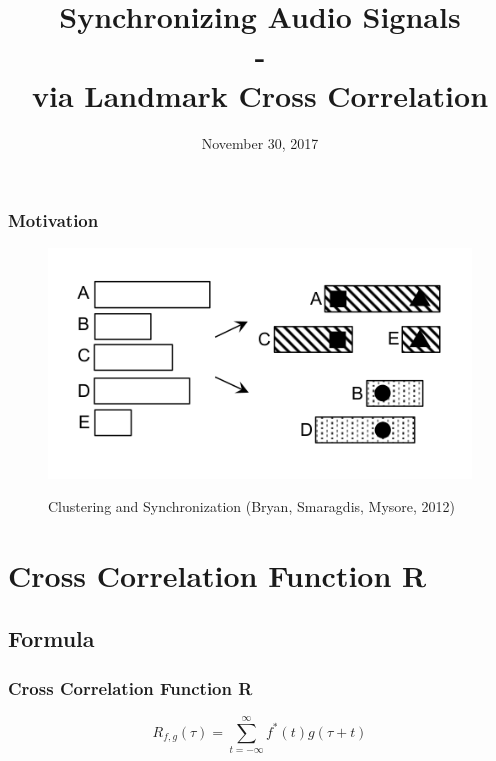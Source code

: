 \documentclass{beamer}
\title[Cross Correlation]{Synchronizing Audio Signals\\ - \\ via Landmark Cross Correlation} %
\institute[Uni Bi] %
{

\textit{by Lea N. Possberg} %

\medskip

Seminar: Speech Processing \\ %




}
\date{November 30, 2017} %
\begin{document}
\begin{frame}
\titlepage %
\end{frame}


\begin{frame}
\frametitle{Motivation} %
\begin{figure}
\begin{center}
\includegraphics[scale=0.3]{pngs/01_orig_cluster_synch.png} \\
\caption{Clustering and Synchronization (Bryan, Smaragdis, Mysore, 2012)}
\end{center}
\end{figure}
\end{frame}




\section{Cross Correlation Function R}

\subsection{Formula}
\begin{frame}
\frametitle{Cross Correlation Function R}
\begin{displaymath}
R_{f,g}(\tau)= \sum_{ t = -\infty}^{\infty}  f^*(t) g(\tau +t) %
\end{displaymath}
\end{frame}
\end{document}
